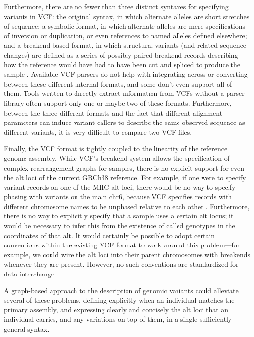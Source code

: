 Furthermore, there are no fewer than three distinct syntaxes for specifying variants in VCF: the original syntax, in which alternate alleles are short stretches of sequence; a symbolic format, in which alternate alleles are mere specifications of inversion or duplication, or even references to named alleles defined elsewhere; and a breakend-based format, in which structural variants (and related sequence changes) are defined as a series of possibly-paired breakend records describing how the reference would have had to have been cut and spliced to produce the sample \cite{marshall2013variant}. Available VCF parsers do not help with integrating across or converting between these different internal formats, and some don't even support all of them. Tools written to directly extract information from VCFs without a parser library often support only one or maybe two of these formats. Furthermore, between the three different formats and the fact that different alignment parameters can induce variant callers to describe the same observed sequence as different variants, it is very difficult to compare two VCF files.

Finally, the VCF format is tightly coupled to the linearity of the reference genome assembly. While VCF's breakend system allows the specification of complex rearrangement graphs for samples, there is no explicit support for even the alt loci of the current GRCh38 reference. For example, if one were to specify variant records on one of the MHC alt loci, there would be no way to specify phasing with variants on the main chr6, because VCF specifies records with different chromosome names to be unphased relative to each other \cite{marshall2013variant}. Furthermore, there is no way to explicitly specify that a sample uses a certain alt locus; it would be necessary to infer this from the existence of called genotypes in the coordinates of that alt. It would certainly be possible to adopt certain conventions within the existing VCF format to work around this problem---for example, we could wire the alt loci into their parent chromosomes with breakends whenever they are present. However, no such conventions are standardized for data interchange.

A graph-based approach to the description of genomic variants could alleviate several of these problems, defining explicitly when an individual matches the primary assembly, and expressing clearly and concisely the alt loci that an individual carries, and any variations on top of them, in a single sufficiently general syntax.

